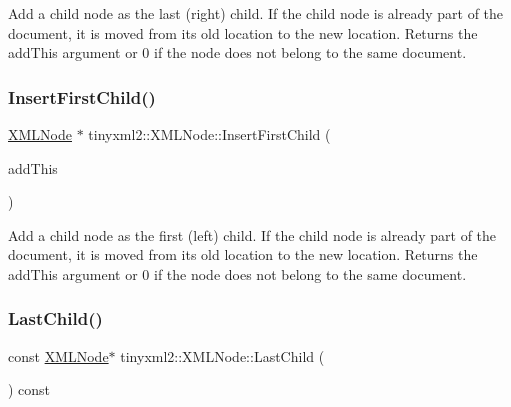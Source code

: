 Add a child node as the last (right) child. If the child node is already part of the document, it is moved from its old location to the new location. Returns the add\+This argument or 0 if the node does not belong to the same document. \mbox{\label{classtinyxml2_1_1_x_m_l_node_ac609a8f3ea949027f439280c640bbaf2}} 
\subsubsection{\texorpdfstring{Insert\+First\+Child()}{InsertFirstChild()}}
{\footnotesize\ttfamily \mbox{\hyperlink{classtinyxml2_1_1_x_m_l_node}{X\+M\+L\+Node}} $\ast$ tinyxml2\+::\+X\+M\+L\+Node\+::\+Insert\+First\+Child (\begin{DoxyParamCaption}\item[{\mbox{\hyperlink{classtinyxml2_1_1_x_m_l_node}{X\+M\+L\+Node}} $\ast$}]{add\+This }\end{DoxyParamCaption})}

Add a child node as the first (left) child. If the child node is already part of the document, it is moved from its old location to the new location. Returns the add\+This argument or 0 if the node does not belong to the same document. \mbox{\label{classtinyxml2_1_1_x_m_l_node_a9b8583a277e8e26f4cbbb5492786778e}} 
\subsubsection{\texorpdfstring{Last\+Child()}{LastChild()}\hspace{0.1cm}{\footnotesize\ttfamily [1/2]}}
{\footnotesize\ttfamily const \mbox{\hyperlink{classtinyxml2_1_1_x_m_l_node}{X\+M\+L\+Node}}$\ast$ tinyxml2\+::\+X\+M\+L\+Node\+::\+Last\+Child (\begin{DoxyParamCaption}{ }\end{DoxyParamCaption}) const\hspace{0.3cm}{\ttfamily [inline]}}



